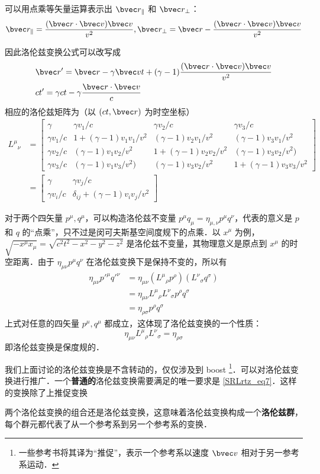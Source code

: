可以用点乘等矢量运算表示出 $\bvec r_\parallel$ 和 $\bvec r_\perp$：
\begin{equation}
\bvec r_{\parallel}=\frac{(\bvec r\cdot \bvec v)\bvec v}{v^2},\bvec r_{\perp}=\bvec r-\frac{(\bvec r\cdot \bvec v)\bvec v}{v^2}
\end{equation}

因此洛伦兹变换公式可以改写成
\begin{equation}
\begin{aligned}
&\bvec r'=\bvec r-\gamma\bvec v t+(\gamma-1)\frac{(\bvec r\cdot \bvec v)\bvec v}{v^2}\\
&ct'=\gamma ct-\gamma\frac{\bvec r\cdot\bvec v}{c}
\end{aligned}
\end{equation}
相应的洛伦兹矩阵为（以 $(ct,\bvec r)$ 为时空坐标）
\begin{equation}\label{SRLrtz_eq6}
\begin{aligned}
{L^\mu}_\nu&=
\left[\begin{matrix}
\gamma& \gamma v_1/c & \gamma v_2/c& \gamma v_3/c\\
\gamma v_1/c&1+(\gamma-1)v_1v_1/v^2& (\gamma-1)v_2v_1/v^2&(\gamma-1)v_3v_1/v^2\\
\gamma v_2/c &(\gamma-1)v_1v_2/v^2&1+(\gamma-1)v_2v_2/v^2&(\gamma-1)v_3v_2/v^2)\\
\gamma v_3/c&(\gamma-1)v_1v_3/v^2)&(\gamma-1)v_3v_2/v^2&1+(\gamma-1)v_3v_3/v^2
\end{matrix}\right]\\
&=\left[\begin{matrix}
\gamma & \gamma v_j/c \\
\gamma v_i/c & \delta_{ij}+(\gamma-1)v_iv_j/v^2
\end{matrix}
\right]
\end{aligned}
\end{equation}

对于两个四矢量 $p^\mu,q^\mu$，可以构造洛伦兹不变量 $p^\mu q_\mu=\eta_{\mu,\nu}p^\mu q^\nu$，代表的意义是 $p$ 和 $q$ 的“点乘”，只不过是闵可夫斯基空间度规下的点乘．以 $x^\mu$ 为例，$\sqrt{-x^\mu x_\mu}=\sqrt{c^2t^2-x^2-y^2-z^2}$ 是洛伦兹不变量，其物理意义是原点到 $x^\mu$ 的时空距离．由于 $\eta_{\mu\nu}p^\mu q^\nu$ 在洛伦兹变换下是保持不变的，所以有
\begin{equation}
\begin{aligned}
\eta_{\mu\nu}p'^\mu q'^\nu&=\eta_{\mu\nu}({L^\mu}_\rho p^\rho) ({L^\nu}_\sigma q^\sigma)\\
&=\eta_{\mu\nu}{L^\mu}_\rho {L^\nu}_\sigma p^\rho q^\sigma
\\
&=\eta_{\rho\sigma} p^\rho q^\sigma
\end{aligned}
\end{equation}
上式对任意的四矢量 $p^\mu,q^\mu$ 都成立，这体现了洛伦兹变换的一个性质：
\begin{equation}\label{SRLrtz_eq7}
\eta_{\mu\nu}{L^\mu}_\rho {L^\nu}_\sigma=\eta_{\rho\sigma}
\end{equation}
即洛伦兹变换是保度规的．

我们上面讨论的洛伦兹变换是不含转动的，仅仅涉及到 boost \footnote{一些参考书将其译为“推促”，表示一个参考系以速度 $\bvec v$ 相对于另一参考系运动．}．可以对洛伦兹变换进行推广．一个\textbf{普通的}洛伦兹变换需要满足的唯一要求是 \autoref{SRLrtz_eq7}．这样的变换除了上推促变换

两个洛伦兹变换的组合还是洛伦兹变换，这意味着洛伦兹变换构成一个\textbf{洛伦兹群}，每个群元都代表了从一个参考系到另一个参考系的变换．

